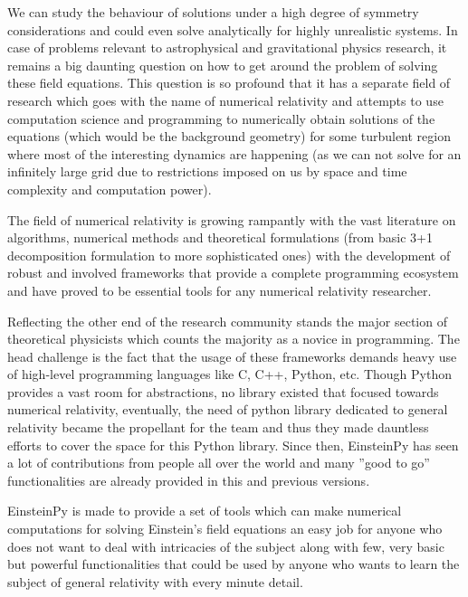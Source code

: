 \documentclass[refree]{aa}
\begin{document}
   We can study the behaviour of solutions under a high degree of symmetry 
   considerations and could even solve analytically for highly unrealistic 
   systems. In case of problems relevant to astrophysical and gravitational 
   physics research, it remains a big daunting question on how to get around 
   the problem of solving these field equations. This question is so profound 
   that it has a separate field of research which goes with the name of numerical  
   relativity and attempts to use computation science and programming to numerically 
   obtain solutions of the equations (which would be the background geometry) 
   for some turbulent region where most of the interesting dynamics are happening 
   (as we can not solve for an infinitely large grid due to restrictions imposed 
   on us by space and time complexity and computation power). 

   The field of numerical relativity is growing rampantly with the vast literature 
   on algorithms, numerical methods and theoretical formulations (from basic 3+1 
   decomposition formulation to more sophisticated ones) with the development of 
   robust and involved frameworks that provide a complete programming ecosystem 
   and have proved to be essential tools for any numerical relativity researcher.
   
   Reflecting the other end of the research community stands the major section 
   of theoretical physicists which counts the majority as a novice in programming. 
   The head challenge is the fact that the usage of these frameworks demands 
   heavy use of high-level programming languages like C, C++, Python, etc. 
   Though Python provides a vast room for abstractions, no library existed that  
   focused towards numerical relativity, eventually, the need of python library  
   dedicated to general relativity became the propellant for the team and thus 
   they made dauntless efforts to cover the space for this Python library. 
   Since then, EinsteinPy has seen a lot of contributions from people all over 
   the world and many ”good to go” functionalities are already provided in 
   this and previous versions.
   
   EinsteinPy is made to provide a set of tools which can make numerical 
   computations for solving Einstein’s field equations an easy job for anyone 
   who does not want to deal with intricacies of the subject along with few, 
   very basic but powerful functionalities that could be used by anyone who 
   wants to learn the subject of general relativity with every minute detail.
   
\end{document}
